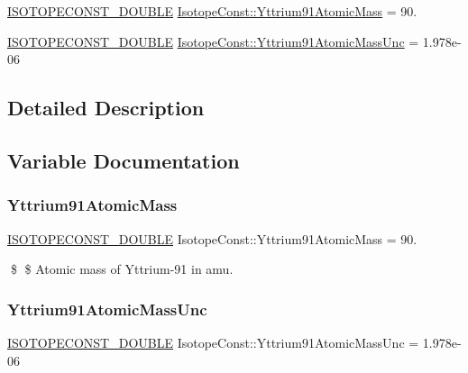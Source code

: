\begin{DoxyCompactItemize}
\item 
\mbox{\hyperlink{group___isotope_const-_macros_ga8f45a7272ce02c0b4c65c44636ed719a}{I\+S\+O\+T\+O\+P\+E\+C\+O\+N\+S\+T\+\_\+\+D\+O\+U\+B\+LE}} \mbox{\hyperlink{group___isotope_const-_yttrium-_y91_ga643797a75bad802f1974923760c3c7c2}{Isotope\+Const\+::\+Yttrium91\+Atomic\+Mass}} = 90.
\item 
\mbox{\hyperlink{group___isotope_const-_macros_ga8f45a7272ce02c0b4c65c44636ed719a}{I\+S\+O\+T\+O\+P\+E\+C\+O\+N\+S\+T\+\_\+\+D\+O\+U\+B\+LE}} \mbox{\hyperlink{group___isotope_const-_yttrium-_y91_gab065708157ba2525d345a68a15e18a64}{Isotope\+Const\+::\+Yttrium91\+Atomic\+Mass\+Unc}} = 1.\+978e-\/06
\end{DoxyCompactItemize}


\subsection{Detailed Description}


\subsection{Variable Documentation}
\mbox{\label{group___isotope_const-_yttrium-_y91_ga643797a75bad802f1974923760c3c7c2}} 
\subsubsection{\texorpdfstring{Yttrium91\+Atomic\+Mass}{Yttrium91AtomicMass}}
{\footnotesize\ttfamily \mbox{\hyperlink{group___isotope_const-_macros_ga8f45a7272ce02c0b4c65c44636ed719a}{I\+S\+O\+T\+O\+P\+E\+C\+O\+N\+S\+T\+\_\+\+D\+O\+U\+B\+LE}} Isotope\+Const\+::\+Yttrium91\+Atomic\+Mass = 90.}

\$ \$ Atomic mass of Yttrium-\/91 in amu. \mbox{\label{group___isotope_const-_yttrium-_y91_gab065708157ba2525d345a68a15e18a64}} 
\subsubsection{\texorpdfstring{Yttrium91\+Atomic\+Mass\+Unc}{Yttrium91AtomicMassUnc}}
{\footnotesize\ttfamily \mbox{\hyperlink{group___isotope_const-_macros_ga8f45a7272ce02c0b4c65c44636ed719a}{I\+S\+O\+T\+O\+P\+E\+C\+O\+N\+S\+T\+\_\+\+D\+O\+U\+B\+LE}} Isotope\+Const\+::\+Yttrium91\+Atomic\+Mass\+Unc = 1.\+978e-\/06}

